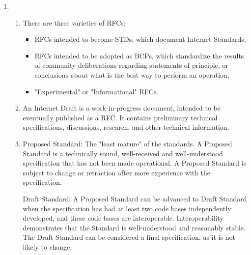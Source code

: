 \documentclass{article}
\begin{document}
\begin{enumerate}
\begin{enumerate}
$$ \frac{\SI{10000}{\bit}}{\SI{2}{\mega\bit\per\second}} = \SI{0.005}{\second} $$

The second packet will be fully received at the first switch at the same time that the first packet will be fully received at the second switch, at \SI{0.010}{\second}.

\item To move the file from source host to destination host when message segmentation is used, the total time will be:

$$ t_{total} = t_{packet1} + (N-1)t_d $$
$$ t_{total} = \SI{0.015}{\second} + (800-1)(\SI{0.005}{\second}) $$
$$ t_{total} = \SI{4.010}{\second}$$

It took almost 3 times longer, at 12 seconds, to move the file without segmentation. Therefore, segmentation provides a significant advantage.

\end{enumerate}

\item
\begin{enumerate}

\item There are three varieties of RFCs:
\begin{itemize}
\item RFCs intended to become STDs, which document Internet Standards;
\item RFCs intended to be adopted as BCPs, which standardize the results of community deliberations regarding statements of principle, or conclusions about what is the best way to perform an operation;
\item "Experimental" or "Informational" RFCs.
\end{itemize}

\item An Internet Draft is a work-in-progress document, intended to be eventually published as a RFC. It contains preliminary technical specifications, discussions, research, and other technical information.

\item Proposed Standard: The "least mature" of the standards. A Proposed Standard is a technically sound, well-received and well-understood specification that has not been made operational. A Proposed Standard is subject to change or retraction after more experience with the specification.

Draft Standard: A Proposed Standard can be advanced to Draft Standard when the specification has had at least two code bases independently developed, and these code bases are interoperable. Interoperability demonstrates that the Standard is well-understood and reasonably stable. The Draft Standard can be considered a final specification, as it is not likely to change.


\end{enumerate}
\end{enumerate}
\end{document}
